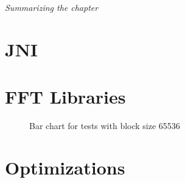 \textit{Summarizing the chapter}

\section{JNI}

\section{FFT Libraries}

\begin{figure}
    \centering
    \resizebox{\columnwidth}{!}{
        
    }
    \label{tab:barchart:65536}
    \caption{Bar chart for tests with block size 65536}
\end{figure}


\section{Optimizations}
